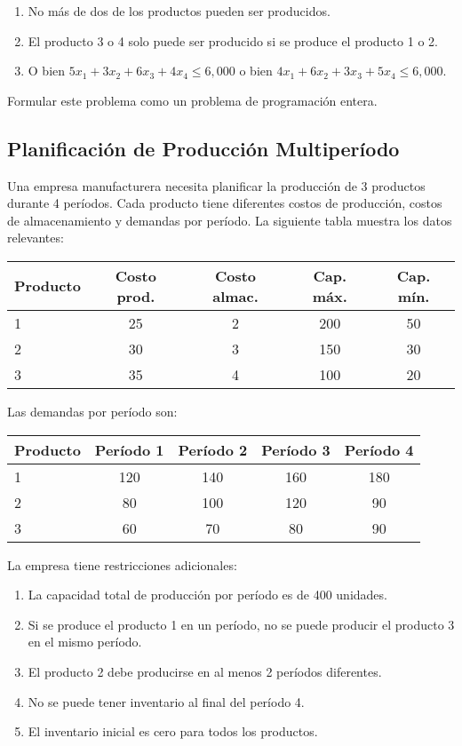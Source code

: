 \documentclass[12pt]{article}
\begin{document}
\begin{enumerate}[label=\arabic*.]
    \item No más de dos de los productos pueden ser producidos.
    \item El producto 3 o 4 solo puede ser producido si se produce el producto 1 o 2.
    \item O bien $5x_1 + 3x_2 + 6x_3 + 4x_4 \leq 6,000$ o bien $4x_1 + 6x_2 + 3x_3 + 5x_4 \leq 6,000$.
\end{enumerate}

Formular este problema como un problema de programación entera.

\subsection{Planificación de Producción Multiperíodo}
Una empresa manufacturera necesita planificar la producción de 3 productos durante 4 períodos. Cada producto tiene diferentes costos de producción, costos de almacenamiento y demandas por período. La siguiente tabla muestra los datos relevantes:

\begin{table}[h]
\centering
\begin{tabular}{lcccc}
\toprule
\textbf{Producto} & \textbf{Costo prod.} & \textbf{Costo almac.} & \textbf{Cap. máx.} & \textbf{Cap. mín.} \\
\midrule
1 & 25 & 2 & 200 & 50 \\
2 & 30 & 3 & 150 & 30 \\
3 & 35 & 4 & 100 & 20 \\
\bottomrule
\end{tabular}
\end{table}

Las demandas por período son:
\begin{table}[h]
\centering
\begin{tabular}{lcccc}
\toprule
\textbf{Producto} & \textbf{Período 1} & \textbf{Período 2} & \textbf{Período 3} & \textbf{Período 4} \\
\midrule
1 & 120 & 140 & 160 & 180 \\
2 & 80 & 100 & 120 & 90 \\
3 & 60 & 70 & 80 & 90 \\
\bottomrule
\end{tabular}
\end{table}

La empresa tiene restricciones adicionales:
\begin{enumerate}[label=\arabic*.]
    \item La capacidad total de producción por período es de 400 unidades.
    \item Si se produce el producto 1 en un período, no se puede producir el producto 3 en el mismo período.
    \item El producto 2 debe producirse en al menos 2 períodos diferentes.
    \item No se puede tener inventario al final del período 4.
    \item El inventario inicial es cero para todos los productos.
\end{enumerate}
\end{document}
